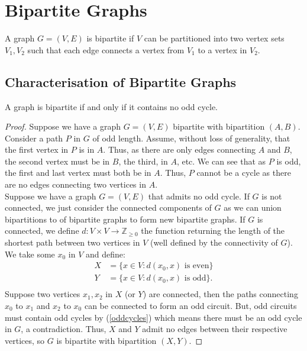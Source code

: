 \section{Bipartite Graphs}

A graph $G = (V, E)$ is bipartite if $V$ can be partitioned into
two vertex sets $V_1, V_2$ such that each edge connects a vertex
from $V_1$ to a vertex in $V_2$.

\subsection{Characterisation of Bipartite Graphs}

A graph is bipartite if and only if it contains no odd cycle.

\begin{proof}
    Suppose we have a graph $G = (V, E)$ bipartite with bipartition
    $(A, B)$. Consider a path $P$ in $G$ of odd length.
    Assume, without loss of generality, that the first
    vertex in $P$ is in $A$. Thus, as there are only edges
    connecting $A$ and $B$, the second vertex must be in $B$,
    the third, in $A$, etc. We can see that as $P$ is odd,
    the first and last vertex must both be in $A$. Thus,
    $P$ cannot be a cycle as there are no edges connecting
    two vertices in $A$.
    \\[\baselineskip]
    Suppose we have a graph $G = (V, E)$ that admits no odd
    cycle. If $G$ is not connected, we just consider the
    connected components of $G$ as we can union bipartitions
    to of bipartite graphs to form new bipartite graphs.
    If $G$ is connected, we define 
    $d : V \times V \to \mathbb{Z}_{\geq 0}$
    the function returning the length of the shortest path
    between two vertices in $V$ (well defined by the connectivity
    of $G$). We take some $x_0$ in $V$ and define: \begin{align*}
        X &= \{x \in V : d(x_0, x) \text{ is even}\} \\
        Y &= \{x \in V : d(x_0, x) \text{ is odd}\}. \\
    \end{align*} Suppose two vertices $x_1, x_2$ in $X$ 
    (or $Y$) are connected, then the paths connecting
    $x_0$ to $x_1$ and $x_2$ to $x_0$ can be connected to
    form an odd circuit. But, odd circuits must contain odd cycles
    by (\ref{oddcycles}) which means there must be an odd cycle in $G$, a contradiction.
    Thus, $X$ and $Y$ admit no edges between their respective
    vertices, so $G$ is bipartite with bipartition $(X, Y)$.
 
\end{proof}

